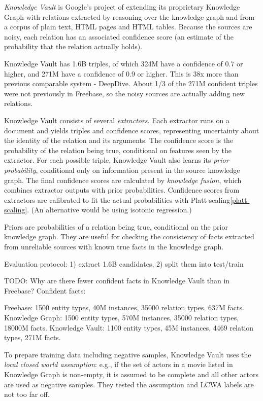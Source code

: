 \textit{Knowledge Vault}\cite{knowledge-vault} is Google's project of extending
its proprietary Knowledge Graph with relations extracted by reasoning over
the knowledge graph and from a corpus of plain text, HTML pages and HTML
tables. Because the sources are noisy, each relation has an associated
confidence score (an estimate of the probability that the relation actually
holds).

Knowledge Vault has 1.6B triples, of which 324M have a confidence of 0.7 or
higher, and 271M have a confidence of 0.9 or higher.
This is 38x more than previous comparable system - DeepDive.
About 1/3 of the 271M confident triples were not previously in Freebase, so
the noisy sources are actually adding new relations.

Knowledge Vault consists of several \textit{extractors}. Each extractor runs on a
document and yields triples and confidence scores, representing uncertainty
about the identity of the relation and its arguments. The confidence score is
the probability of the relation being true, conditional on features seen by
the extractor.
For each possible triple, Knowledge Vault also learns its \textit{prior
probability}, conditional only on information present in the source knowledge
graph.
The final confidence scores are calculated by \textit{knowledge fusion},
which combines extractor outputs with prior probabilities.
Confidence scores from extractors are calibrated to fit the actual probabilities
with Platt scaling\ref{platt-scaling}.
(An alternative would be using isotonic regression.)

Priors are probabilities of a relation being true, conditional
on the prior knowledge graph. They are useful for checking the consistency of
facts extracted from unreliable sources with known true facts in the knowledge
graph.

Evaluation protocol: 1) extract 1.6B candidates, 2) split them into test/train

TODO: Why are there fewer confident facts in Knowledge Vault than in Freebase?
Confident facts:

Freebase: 1500 entity types, 40M instances, 35000 relation types, 637M
facts.
Knowledge Graph: 1500 entity types, 570M instances, 35000 relation types, 18000M
facts.
Knowledge Vault: 1100 entity types, 45M instances, 4469 relation types, 271M
facts.

To prepare training data including negative samples, Knowledge Vault uses the
\textit{local closed world assumption}: e.g., if the set of actors in a movie listed
in Knowledge Graph is non-empty, it is assumed to be complete and all other
actors are used as negative samples.
They tested the assumption and LCWA labels are not too far off.

